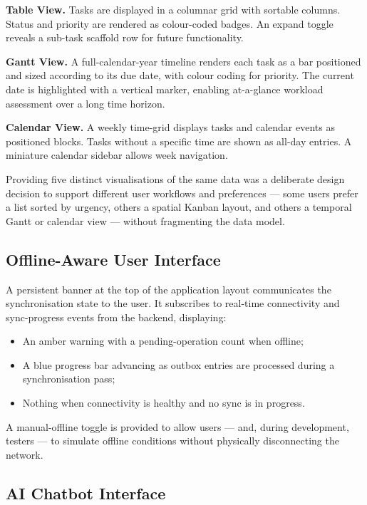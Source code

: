 \textbf{Table View.}
Tasks are displayed in a columnar grid with sortable columns. Status and
priority are rendered as colour-coded badges. An expand toggle reveals a
sub-task scaffold row for future functionality.

\textbf{Gantt View.}
A full-calendar-year timeline renders each task as a bar positioned and sized
according to its due date, with colour coding for priority. The current date is
highlighted with a vertical marker, enabling at-a-glance workload assessment
over a long time horizon.

\textbf{Calendar View.}
A weekly time-grid displays tasks and calendar events as positioned blocks.
Tasks without a specific time are shown as all-day entries. A miniature
calendar sidebar allows week navigation.

Providing five distinct visualisations of the same data was a deliberate design
decision to support different user workflows and preferences --- some users
prefer a list sorted by urgency, others a spatial Kanban layout, and others a
temporal Gantt or calendar view --- without fragmenting the data model.

\subsection{Offline-Aware User Interface}\label{sec:meth_connbar}

A persistent banner at the top of the application layout communicates the
synchronisation state to the user. It subscribes to real-time connectivity and
sync-progress events from the backend, displaying:
\begin{itemize}
    \item An amber warning with a pending-operation count when offline;
    \item A blue progress bar advancing as outbox entries are processed
          during a synchronisation pass;
    \item Nothing when connectivity is healthy and no sync is in progress.
\end{itemize}
A manual-offline toggle is provided to allow users --- and, during development,
testers --- to simulate offline conditions without physically disconnecting
the network.

\subsection{AI Chatbot Interface}\label{sec:meth_chatbot}

